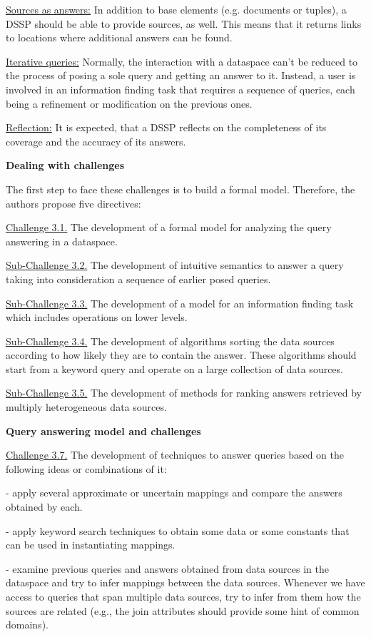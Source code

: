 \uline{Sources as answers:} In addition to base elements (e.g. documents or tuples), a DSSP should be able to provide sources, as well. This means that it returns links to locations where additional answers can be found.

\uline{Iterative queries:} Normally, the interaction with a dataspace can't be reduced to the process of posing  a sole query and getting an answer to it. Instead, a user is involved in an information finding task that requires a sequence of queries, each being a refinement or modification on the previous ones.

\uline{Reflection:} It is expected, that a DSSP reflects on the completeness of its coverage and the accuracy of its answers. 


\textbf{Dealing with challenges}

The first step to face these challenges is to build a formal model. Therefore, the authors propose five directives:

\uline{Challenge 3.1.}  The development of a formal model for analyzing the query answering in a dataspace. 

\uline{Sub-Challenge 3.2.} The development of intuitive semantics to answer a query taking into consideration a sequence of earlier posed queries. 

\uline{Sub-Challenge 3.3.} The development of a model for an information finding task which includes operations on lower levels. 

\uline{Sub-Challenge 3.4.} The development of algorithms sorting the data sources according to how likely they are to contain the answer. These algorithms should start from a keyword query and operate on a large collection of data sources.

\uline{Sub-Challenge 3.5.} The development of methods for ranking answers retrieved by multiply heterogeneous data sources.


\textbf{Query answering model and challenges}

\uline{Challenge 3.7.} The development of techniques to answer queries based on the following ideas or  
combinations of it:

- apply several approximate or uncertain mappings and compare the answers obtained by each.

- apply keyword search techniques to obtain some data or some constants that can be used in instantiating mappings.

- examine previous queries and answers obtained from data sources in the dataspace and try to infer mappings between the data sources. Whenever we have access to queries that span multiple data sources, try to infer from them how the sources are related (e.g., the join attributes should provide some hint of common domains).

